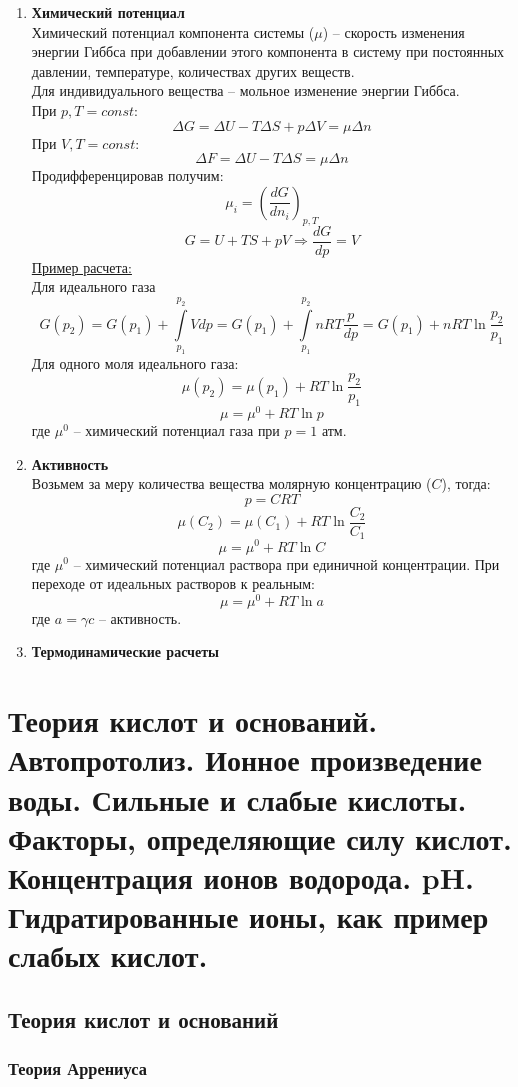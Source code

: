 \documentclass[14pt,a4paper]{scrartcl}
\begin{document}
\begin{enumerate}[label=\arabic*)]
	\item \textbf{Химический потенциал} \\
	Химический потенциал компонента системы ($\mu$) -- скорость изменения энергии Гиббса при добавлении этого компонента в систему при постоянных давлении, температуре, количествах других веществ. \\
	Для индивидуального вещества -- мольное изменение энергии Гиббса. \\
	При $p, T = const $:
	\[
	\Delta{G} = \Delta{U} - T \Delta{S} + p \Delta{V} = \mu \Delta{n}
	\]
	При $V, T = const $:
	\[
	\Delta{F} = \Delta{U} - T \Delta{S} = \mu \Delta{n}
	\]
	Продифференцировав получим:
	\[
	\mu_i = \left(\dfrac{dG}{dn_i}\right)_{p,T}
	\]
	\[
	G = U + TS + pV \Rightarrow \dfrac{dG}{dp} = V
	\]
	\ul{Пример расчета:} \\
	Для идеального газа 
	\[
	G(p_2) = G (p_1) + \int\limits_{p_1}^{p_2} V dp = G(p_1) + \int\limits_{p_1}^{p_2} nRT \dfrac{p}{dp} = G(p_1) + nRT \ln{\dfrac{p_2}{p_1}}	
	\]
	Для одного моля идеального газа:
	\[
	\mu (p_2) = \mu(p_1) + RT \ln{\dfrac{p_2}{p_1}}	
	\]
	\[
	\mu = \mu^0 + RT \ln{p}
	\]
	где $\mu^0$ -- химический потенциал газа при $p = 1$ атм.
	\item \textbf{Активность} \\
	Возьмем за меру количества вещества молярную концентрацию ($C$), тогда:
	$$ p=CRT $$
	\[
	\mu (C_2) = \mu(C_1) + RT \ln{\dfrac{C_2}{C_1}}	
	\]
	\[
	\mu = \mu^0 + RT \ln{C}
	\]
	где $\mu^0$ -- химический потенциал раствора при единичной концентрации.
	При переходе от идеальных растворов к реальным:
	\[
	\mu = \mu^0 + RT \ln{a}
	\]
	где $a = \gamma c$ -- активность. 
	\item \textbf{Термодинамические расчеты} \\
\end{enumerate}


\section{Теория кислот и оснований. Автопротолиз. Ионное произведение воды. Сильные и слабые кислоты. Факторы, определяющие силу кислот. Концентрация ионов водорода. pH. Гидратированные ионы, как пример слабых кислот.}
\subsection{Теория кислот и оснований}
\subsubsection{Теория Аррениуса}
\end{document}

